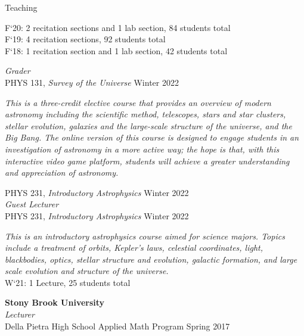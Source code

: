 \documentclass{resume} %
\newcommand{\forceindent}{\leavevmode{\parindent=1em\indent}}
\begin{document}
\begin{rSection}{Teaching}
\begin{description}[leftmargin=2em, style=nextline]
\forceindent \forceindent F`20: 2 recitation sections and 1 lab section, 84 students total\\
\forceindent \forceindent F`19: 4 recitation sections, 92 students total\\
\forceindent \forceindent F`18: 1 recitation section and 1 lab section, 42 students total
\end{description}
\vspace{-0.5em}
\textit{Grader} \\
\forceindent PHYS 131, \textit{Survey of the Universe} \hfill {Winter 2022}
\begin{description}[leftmargin=2em, style=nextline]
\vspace{-0.5em}
\item[~]\textit{This is a three-credit elective course that provides an overview of modern astronomy including the scientific method, telescopes, stars and star clusters, stellar evolution, galaxies and the large-scale structure of the universe, and the Big Bang. The online version of this course is designed to engage students in an investigation of astronomy in a more active way; the hope is that, with this interactive video game platform, students will achieve a greater understanding and appreciation of astronomy.}
\end{description}
\vspace{-0.5}
\forceindent PHYS 231, \textit{Introductory Astrophysics} \hfill {Winter 2022}\\
\textit{Guest Lecturer} \\
\forceindent PHYS 231, \textit{Introductory Astrophysics} \hfill {Winter 2022}
\begin{description}[leftmargin=2em, style=nextline]
\vspace{-0.5em}
\item[~]\textit{This is an introductory astrophysics course aimed for science majors. Topics include
a treatment of orbits, Kepler’s laws, celestial coordinates, light, blackbodies, optics, stellar structure and
evolution, galactic formation, and large scale evolution and structure of the universe.}\\
\forceindent \forceindent W`21: 1 Lecture, 25 students total
\end{description}
\vspace{-0.5}
\textbf{Stony Brook University} \\
\textit{Lecturer}\\
\forceindent  Della Pietra High School Applied Math Program \hfill {Spring 2017}


\end{rSection}
\end{document}
